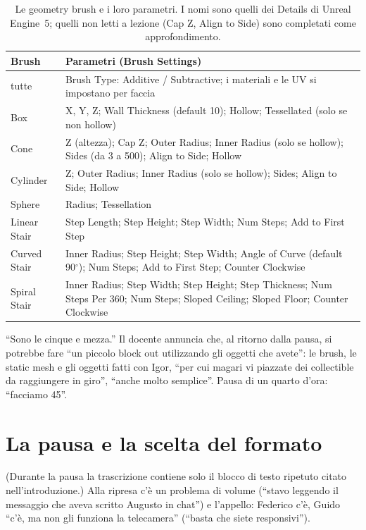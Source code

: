 \begin{table}[htbp]
\centering
\small
\begin{tabular}{@{}p{2.5cm}p{11.5cm}@{}}
\toprule
\textbf{Brush} & \textbf{Parametri (Brush Settings)} \\
\midrule
tutte & Brush Type: Additive / Subtractive; i materiali e le UV si impostano per faccia \\
Box & X, Y, Z; Wall Thickness (default 10); Hollow; Tessellated (solo se non hollow) \\
Cone & Z (altezza); Cap Z; Outer Radius; Inner Radius (solo se hollow); Sides (da 3 a
500); Align to Side; Hollow \\
Cylinder & Z; Outer Radius; Inner Radius (solo se hollow); Sides; Align to Side; Hollow \\
Sphere & Radius; Tessellation \\
Linear Stair & Step Length; Step Height; Step Width; Num Steps; Add to First Step \\
Curved Stair & Inner Radius; Step Height; Step Width; Angle of Curve (default
90$^\circ$); Num Steps; Add to First Step; Counter Clockwise \\
Spiral Stair & Inner Radius; Step Width; Step Height; Step Thickness; Num Steps Per 360;
Num Steps; Sloped Ceiling; Sloped Floor; Counter Clockwise \\
\bottomrule
\end{tabular}
\caption{Le geometry brush e i loro parametri. I nomi sono quelli dei Details di Unreal
Engine~5; quelli non letti a lezione (Cap Z, Align to Side) sono completati come
approfondimento.}
\label{ue13:tab:brush}
\end{table}

``Sono le cinque e mezza.'' Il docente annuncia che, al ritorno dalla pausa, si potrebbe
fare ``un piccolo block out utilizzando gli oggetti che avete'': le brush, le static mesh e
gli oggetti fatti con Igor, ``per cui magari vi piazzate dei collectible da raggiungere in
giro'', ``anche molto semplice''. Pausa di un quarto d'ora: ``facciamo 45''.

\section{La pausa e la scelta del formato}
\label{ue13:sec:pausa}

(Durante la pausa la trascrizione contiene solo il blocco di testo ripetuto citato
nell'introduzione.) Alla ripresa c'è un problema di volume (``stavo leggendo il messaggio
che aveva scritto Augusto in chat'') e l'appello: Federico c'è, Guido ``c'è, ma non gli
funziona la telecamera'' (``basta che siete responsivi'').

